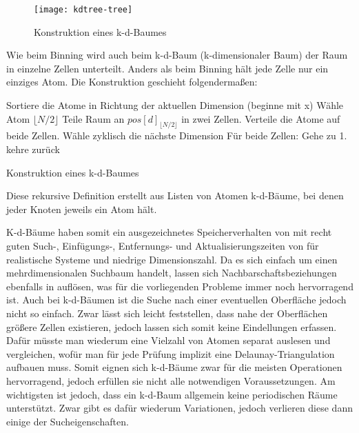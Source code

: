 \begin{figure}[bthp]
  \texttt{[image: kdtree-tree]}
  \caption[Konstruktion eines k-d-Baumes]{Konstruktion eines k-d-Baumes}
  \label{fig:kdtree}
\end{figure}

Wie beim Binning wird auch beim k-d-Baum (k-dimensionaler Baum) der Raum in einzelne Zellen unterteilt.
Anders als beim Binning hält jede Zelle nur ein einziges Atom.
Die Konstruktion geschieht folgendermaßen:
\begin{algorithm}
  \begin{algorithmic}
    \STATE Sortiere die Atome in Richtung der aktuellen Dimension (beginne mit x)
    \STATE Wähle Atom $\lfloor N/2 \rfloor$
    \STATE Teile Raum an $pos[d]_{\lfloor N/2 \rfloor}$ in zwei Zellen. Verteile die Atome auf beide Zellen.
    \STATE Wähle zyklisch die nächste Dimension
    \STATE Für beide Zellen: Gehe zu 1.
    \STATE kehre zurück
    \ENDIF
  \end{algorithmic}
  \caption[Konstruktion eines k-d-Baumes]{Konstruktion eines k-d-Baumes}
  \label{algo:kdtree-construction}
\end{algorithm}

Diese rekursive Definition erstellt aus Listen von Atomen k-d-Bäume, bei denen jeder Knoten jeweils ein Atom hält.

K-d-Bäume haben somit ein ausgezeichnetes Speicherverhalten von  mit recht guten Such-, Einfügungs-, Entfernungs- und Aktualisierungszeiten von  für realistische Systeme und niedrige Dimensionszahl.
Da es sich einfach um einen mehrdimensionalen Suchbaum handelt, lassen sich Nachbarschaftsbeziehungen ebenfalls in  auflösen, was für die vorliegenden Probleme immer noch hervorragend ist.
Auch bei k-d-Bäumen ist die Suche nach einer eventuellen Oberfläche jedoch nicht so einfach.
Zwar lässt sich leicht feststellen, dass nahe der Oberflächen größere Zellen existieren, jedoch lassen sich somit keine Eindellungen erfassen.
Dafür müsste man wiederum eine Vielzahl von Atomen separat auslesen und vergleichen, wofür man für jede Prüfung implizit eine Delaunay-Triangulation aufbauen muss.
Somit eignen sich k-d-Bäume zwar für die meisten Operationen hervorragend, jedoch erfüllen sie nicht alle notwendigen Voraussetzungen.
Am wichtigsten ist jedoch, dass ein k-d-Baum allgemein keine periodischen Räume unterstützt.
Zwar gibt es dafür wiederum Variationen, jedoch verlieren diese dann einige der Sucheigenschaften.

